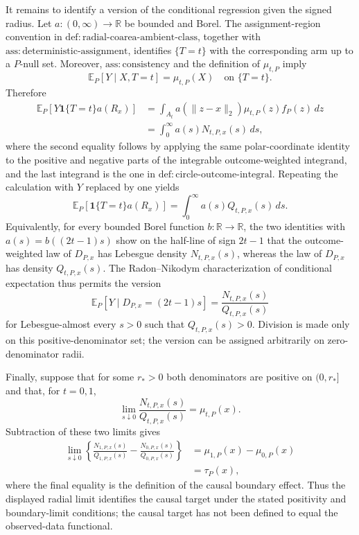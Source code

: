It remains to identify a version of the conditional regression given the signed radius.  Let \(a:(0,\infty)\to\mathbb R\) be bounded and Borel.  The assignment-region convention in \(\mathrm{def:radial\text{-}coarea\text{-}ambient\text{-}class}\), together with \(\mathrm{ass:deterministic\text{-}assignment}\), identifies \(\{T=t\}\) with the corresponding arm up to a \(P\)-null set.  Moreover, \(\mathrm{ass:consistency}\) and the definition of \(\mu_{t,P}\) imply
\[
\mathbb E_P[Y\mid X,T=t]=\mu_{t,P}(X)
\quad\text{on }\{T=t\}.
\]
Therefore
\[
\begin{aligned}
\mathbb E_P\!\left[Y\mathbf 1\{T=t\}a(R_x)\right]
&=\int_{A_t}a(\lVert z-x\rVert_2)\mu_{t,P}(z)f_P(z)\,dz\\
&=\int_0^\infty a(s)N_{t,P,x}(s)\,ds,
\end{aligned}
\]
where the second equality follows by applying the same polar-coordinate identity to the positive and negative parts of the integrable outcome-weighted integrand, and the last integrand is the one in \(\mathrm{def:circle\text{-}outcome\text{-}integral}\).  Repeating the calculation with \(Y\) replaced by one yields
\[
\mathbb E_P\!\left[\mathbf 1\{T=t\}a(R_x)\right]
=\int_0^\infty a(s)Q_{t,P,x}(s)\,ds.
\]
Equivalently, for every bounded Borel function \(b:\mathbb R\to\mathbb R\), the two identities with \(a(s)=b((2t-1)s)\) show on the half-line of sign \(2t-1\) that the outcome-weighted law of \(D_{P,x}\) has Lebesgue density \(N_{t,P,x}(s)\), whereas the law of \(D_{P,x}\) has density \(Q_{t,P,x}(s)\).  The Radon--Nikodym characterization of conditional expectation thus permits the version
\[
\mathbb E_P[Y\mid D_{P,x}=(2t-1)s]
=\frac{N_{t,P,x}(s)}{Q_{t,P,x}(s)}
\]
for Lebesgue-almost every \(s>0\) such that \(Q_{t,P,x}(s)>0\).  Division is made only on this positive-denominator set; the version can be assigned arbitrarily on zero-denominator radii.

Finally, suppose that for some \(r_*>0\) both denominators are positive on \((0,r_*]\) and that, for \(t=0,1\),
\[
\lim_{s\downarrow0}\frac{N_{t,P,x}(s)}{Q_{t,P,x}(s)}=\mu_{t,P}(x).
\]
Subtraction of these two limits gives
\[
\begin{aligned}
\lim_{s\downarrow0}
\left\{
\frac{N_{1,P,x}(s)}{Q_{1,P,x}(s)}
-\frac{N_{0,P,x}(s)}{Q_{0,P,x}(s)}
\right\}
&=\mu_{1,P}(x)-\mu_{0,P}(x)\\
&=\tau_P(x),
\end{aligned}
\]
where the final equality is the definition of the causal boundary effect.  Thus the displayed radial limit identifies the causal target under the stated positivity and boundary-limit conditions; the causal target has not been defined to equal the observed-data functional.